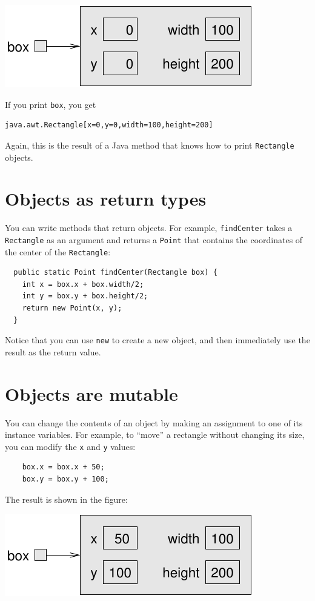 \documentclass[12pt]{book}
\theoremstyle{exercise}
\begin{document}
\includegraphics{figs/rectangle.pdf}

If you print {\tt box}, you get

\begin{lstlisting}
java.awt.Rectangle[x=0,y=0,width=100,height=200]
\end{lstlisting}
%
Again, this is the result of a Java method that knows how
to print {\tt Rectangle} objects.


\section{Objects as return types}

You can write methods that return objects.  For example,
{\tt findCenter} takes a {\tt Rectangle} as an argument and
returns a {\tt Point} that contains the coordinates of the
center of the {\tt Rectangle}:

\begin{lstlisting}
  public static Point findCenter(Rectangle box) {
    int x = box.x + box.width/2;
    int y = box.y + box.height/2;
    return new Point(x, y);
  }
\end{lstlisting}
%
Notice that you can use {\tt new} to create a new object,
and then immediately use the result as the return value.


\section{Objects are mutable}

You can change the contents of an object by making an assignment
to one of its instance variables.  For example, to ``move''
a rectangle without changing its size, you can modify the
{\tt x} and {\tt y} values:

\begin{lstlisting}
    box.x = box.x + 50;
    box.y = box.y + 100;
\end{lstlisting}
%
The result is shown in the figure:


\includegraphics{figs/rectangle2.pdf}
\end{document}
